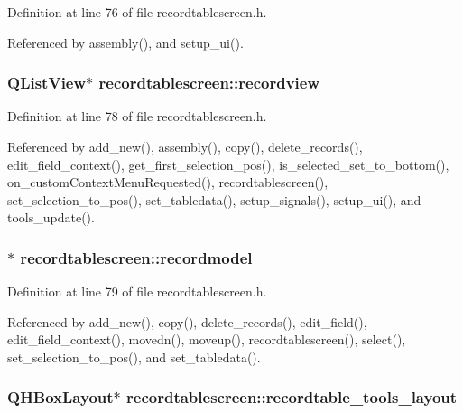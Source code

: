 Definition at line 76 of file recordtablescreen.h.

Referenced by assembly(), and setup\_\-ui().
\subsubsection{\setlength{\rightskip}{0pt plus 5cm}QList\-View$\ast$ {\bf recordtablescreen::recordview}\hspace{0.3cm}{\tt  [private]}}\label{classrecordtablescreen_f155dacd499c3f6da2816da222683e87}




Definition at line 78 of file recordtablescreen.h.

Referenced by add\_\-new(), assembly(), copy(), delete\_\-records(), edit\_\-field\_\-context(), get\_\-first\_\-selection\_\-pos(), is\_\-selected\_\-set\_\-to\_\-bottom(), on\_\-custom\-Context\-Menu\-Requested(), recordtablescreen(), set\_\-selection\_\-to\_\-pos(), set\_\-tabledata(), setup\_\-signals(), setup\_\-ui(), and tools\_\-update().
\subsubsection{$\ast$ {\bf recordtablescreen::recordmodel}\hspace{0.3cm}{\tt  [private]}}\label{classrecordtablescreen_1806a1e7cad7c5037c19ec88f3859f95}




Definition at line 79 of file recordtablescreen.h.

Referenced by add\_\-new(), copy(), delete\_\-records(), edit\_\-field(), edit\_\-field\_\-context(), movedn(), moveup(), recordtablescreen(), select(), set\_\-selection\_\-to\_\-pos(), and set\_\-tabledata().
\subsubsection{\setlength{\rightskip}{0pt plus 5cm}QHBox\-Layout$\ast$ {\bf recordtablescreen::recordtable\_\-tools\_\-layout}\hspace{0.3cm}{\tt  [private]}}\label{classrecordtablescreen_7f35fe695ed9bf611d5c75a33e61693f}





